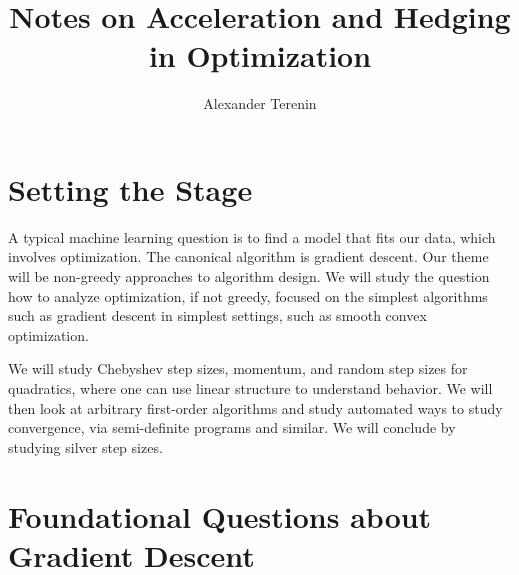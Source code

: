 \documentclass{article}
\title{Notes on Acceleration and Hedging in Optimization}
\author{Alexander Terenin}
\begin{document}
\maketitle

\section{Setting the Stage}

A typical machine learning question is to find a model that fits our data, which involves optimization.
The canonical algorithm is gradient descent.
Our theme will be non-greedy approaches to algorithm design.
We will study the question how to analyze optimization, if not greedy, focused on the simplest algorithms such as gradient descent in simplest settings, such as smooth convex optimization.

We will study Chebyshev step sizes, momentum, and random step sizes for quadratics, where one can use linear structure to understand behavior.
We will then look at arbitrary first-order algorithms and study automated ways to study convergence, via semi-definite programs and similar.
We will conclude by studying silver step sizes.

\section{Foundational Questions about Gradient Descent}
\end{document}
